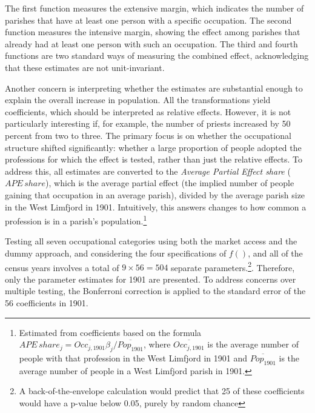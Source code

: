\documentclass[11pt]{article}
\begin{document}
The first function measures the extensive margin, which indicates the number of parishes that have at least one person with a specific occupation. The second function measures the intensive margin, showing the effect among parishes that already had at least one person with such an occupation. The third and fourth functions are two standard ways of measuring the combined effect, acknowledging that these estimates are not unit-invariant. 

Another concern is interpreting whether the estimates are substantial enough to explain the overall increase in population. All the transformations yield coefficients, which should be interpreted as relative effects. However, it is not particularly interesting if, for example, the number of priests increased by 50 percent from two to three. The primary focus is on whether the occupational structure shifted significantly: whether a large proportion of people adopted the professions for which the effect is tested, rather than just the relative effects. To address this, all estimates are converted to the \textit{Average Partial Effect share} ($APE\,share$), which is the average partial effect (the implied number of people gaining that occupation in an average parish), divided by the average parish size in the West Limfjord in 1901. Intuitively, this answers changes to how common a profession is in a parish's population.\footnote{Estimated from coefficients based on the formula $APE\,share_j = \overline{Occ_{j, 1901}}\beta_j / \overline{Pop_{1901}}$, where $\overline{Occ_{j, 1901}}$ is the average number of people with that profession in the West Limfjord in 1901 and $\overline{Pop_{1901}}$ is the average number of people in a West Limfjord parish in 1901. } 

Testing all seven occupational categories using both the market access and the dummy approach, and considering the four specifications of $f()$, and all of the census years involves a total of $9\times56 = 504$ separate parameters.\footnote{A back-of-the-envelope calculation would predict that 25 of these coefficients would have a p-value below 0.05, purely by random chance}. Therefore, only the parameter estimates for 1901 are presented. To address concerns over multiple testing, the Bonferroni correction is applied to the standard error of the 56 coefficients in 1901.
\end{document}
